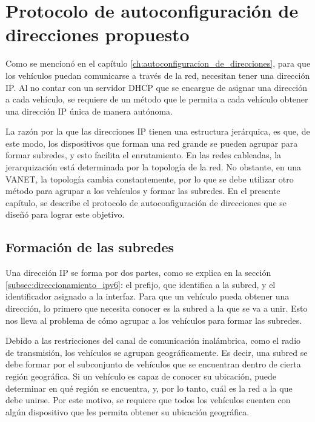 ﻿%
\chapter{Protocolo de autoconfiguración de direcciones propuesto}

\label{ch:autoconfiguracion_de_direcciones_propuesto}

Como se mencionó en el capítulo \ref{ch:autoconfiguracion_de_direcciones}, para
que los vehículos puedan comunicarse a través de la red, necesitan tener una
dirección IP. Al no contar con un servidor DHCP que se encargue de asignar una
dirección a cada vehículo, se requiere de un método que le permita a cada
vehículo obtener una dirección IP única de manera autónoma.

La razón por la que las direcciones IP tienen una estructura jerárquica, es que,
de este modo, los dispositivos que forman una red grande se pueden agrupar para
formar subredes, y esto facilita el enrutamiento. En las redes cableadas, la
jerarquización está determinada por la topología de la red. No obstante, en una
VANET, la topología cambia constantemente, por lo que se debe utilizar otro
método para agrupar a los vehículos y formar las subredes. En el presente
capítulo, se describe el protocolo de autoconfiguración de direcciones que se
diseñó para lograr este objetivo.

\section{Formación de las subredes}

\label{sec:formacion_de_subredes}

Una dirección IP se forma por dos partes, como se explica en la sección
\ref{subsec:direccionamiento_ipv6}: el prefijo, que identifica a la subred, y el
identificador asignado a la interfaz. Para que un vehículo pueda obtener una
dirección, lo primero que necesita conocer es la subred a la que se va a unir.
Esto nos lleva al problema de cómo agrupar a los vehículos para formar las
subredes.

Debido a las restricciones del canal de comunicación inalámbrica, como el
radio de transmisión, los vehículos se agrupan geográficamente. Es decir, una
subred se debe formar por el subconjunto de vehículos que se encuentran dentro
de cierta región geográfica. Si un vehículo es capaz de conocer su ubicación,
puede determinar en qué región se encuentra, y, por lo tanto, cuál es la red a
la que debe unirse. Por este motivo, se requiere que todos los vehículos
cuenten con algún dispositivo que les permita obtener su ubicación geográfica.

